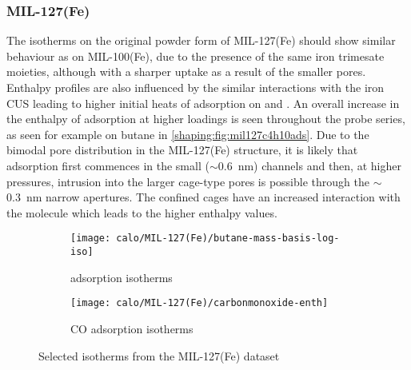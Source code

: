 
\subsubsection{MIL-127(Fe)}

The isotherms on the original powder form of MIL-127(Fe)
should show similar behaviour as on MIL-100(Fe),
due to the presence of the same iron trimesate moieties,
although with a sharper uptake as a result of the smaller pores. Enthalpy
profiles are also influenced by the similar interactions with the iron
\gls{CUS} leading to higher initial heats of adsorption on  and .
An overall increase in the enthalpy of adsorption at higher loadings is seen
throughout the probe series, as seen for example on butane in
\autoref{shaping:fig:mil127c4h10ads}.
Due to the bimodal pore distribution in the MIL-127(Fe) structure,
it is likely that adsorption first commences in the small
(\( \sim \)\SI{0.6}{\nano\metre}) channels and then, at higher pressures,
intrusion into the larger cage-type pores is possible through the
\( \sim \)\SI{0.3}{\nano\metre} narrow apertures.
The confined cages have an increased interaction with the molecule
which leads to the higher enthalpy values.

\begin{figure}[!htb]
	\centering
	\begin{subfigure}{0.45\textwidth}
		\texttt{[image: calo/MIL-127(Fe)/butane-mass-basis-log-iso]}
		\caption{ adsorption isotherms}%
		\label{shaping:fig:mil127c4h10ads}
	\end{subfigure}%
	\begin{subfigure}{0.45\textwidth}
		\texttt{[image: calo/MIL-127(Fe)/carbonmonoxide-enth]}
		\caption{CO adsorption isotherms}%
		\label{shaping:fig:mil127coads}
	\end{subfigure}%
	\caption{Selected isotherms from the MIL-127(Fe) dataset}%
	\label{shaping:fig:mil127isotherms}
\end{figure}

